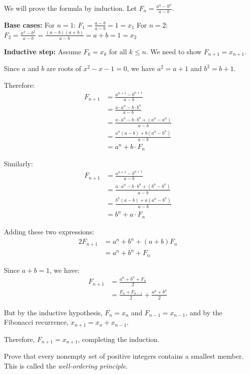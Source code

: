 We will prove the formula by induction. Let $F_n = \frac{a^n - b^n}{a - b}$.

\textbf{Base cases:}
For $n = 1$: $F_1 = \frac{a - b}{a - b} = 1 = x_1$
For $n = 2$: $F_2 = \frac{a^2 - b^2}{a - b} = \frac{(a - b)(a + b)}{a - b} = a + b = 1 = x_2$

\textbf{Inductive step:}
Assume $F_k = x_k$ for all $k \leq n$. We need to show $F_{n+1} = x_{n+1}$.

Since $a$ and $b$ are roots of $x^2 - x - 1 = 0$, we have $a^2 = a + 1$ and $b^2 = b + 1$.

Therefore:
\begin{align*}
F_{n+1} &= \frac{a^{n+1} - b^{n+1}}{a - b} \\
&= \frac{a \cdot a^n - b \cdot b^n}{a - b} \\
&= \frac{a \cdot a^n - b \cdot b^n + (a^n - a^n)}{a - b} \\
&= \frac{a^n(a - b) + b(a^n - b^n)}{a - b} \\
&= a^n + b \cdot F_n
\end{align*}

Similarly:
\begin{align*}
F_{n+1} &= \frac{a^{n+1} - b^{n+1}}{a - b} \\
&= \frac{a \cdot a^n - b \cdot b^n + (b^n - b^n)}{a - b} \\
&= \frac{b^n(a - b) + a(a^n - b^n)}{a - b} \\
&= b^n + a \cdot F_n
\end{align*}

Adding these two expressions:
\begin{align*}
2F_{n+1} &= a^n + b^n + (a + b)F_n \\
&= a^n + b^n + F_n
\end{align*}

Since $a + b = 1$, we have:
\begin{align*}
F_{n+1} &= \frac{a^n + b^n + F_n}{2} \\
&= \frac{F_n + F_{n-1}}{2} + \frac{a^n + b^n}{2}
\end{align*}

But by the inductive hypothesis, $F_n = x_n$ and $F_{n-1} = x_{n-1}$, and by the Fibonacci recurrence, $x_{n+1} = x_n + x_{n-1}$.

Therefore, $F_{n+1} = x_{n+1}$, completing the induction.

\begin{problembox}
Prove that every nonempty set of positive integers contains a smallest member. This is called the \textit{well-ordering principle}.
\end{problembox}

